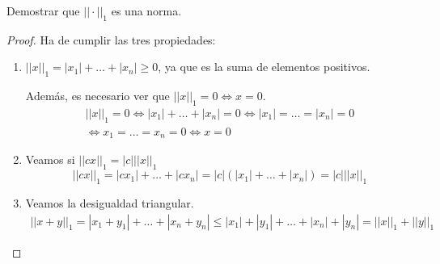 \begin{ejercicio*}
    Demostrar que $||\cdot ||_1$ es una norma.
    \begin{proof} Ha de cumplir las tres propiedades:
    \begin{enumerate}
        \item $||x||_1 = |x_1| + \dots + |x_n| \geq 0$, ya que es la suma de elementos positivos.
        
        Además, es necesario ver que $||x||_1 = 0 \Longleftrightarrow x = 0$.
        \begin{multline*}
            ||x||_1 = 0 \Longleftrightarrow |x_1| + \dots + |x_n| = 0 \Longleftrightarrow |x_1| = \dots = |x_n| = 0 \\
            \Longleftrightarrow x_1 = \dots = x_n = 0 \Longleftrightarrow x = 0
        \end{multline*}

        \item Veamos si $||cx||_1 = |c| ||x||_1$
        \begin{equation*}
            ||cx||_1 = |cx_1| + \dots + |cx_n| = |c|(|x_1| + \dots + |x_n|) = |c|||x||_1
        \end{equation*}

        \item Veamos la desigualdad triangular.
        \begin{multline*}
            ||x+y||_1 = |x_1+y_1| + \dots + |x_n+y_n| \leq |x_1| + |y_1| + \dots + |x_n| + |y_n| = ||x||_1 + ||y||_1
        \end{multline*}
    \end{enumerate}
    \end{proof}
\end{ejercicio*}

